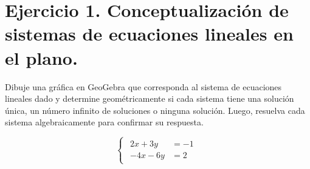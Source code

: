 \section{Ejercicio 1. Conceptualización de sistemas de ecuaciones lineales en el plano.}

Dibuje una gráfica en GeoGebra que corresponda al sistema de ecuaciones lineales dado y determine geométricamente si cada sistema tiene una solución única, un número infinito de soluciones o ninguna solución. Luego, resuelva cada sistema algebraicamente para confirmar su respuesta.

\[
\begin{cases}
    \begin{aligned}
        2x+3y &=-1 \\
        -4x-6y &=2
    \end{aligned}
\end{cases}
\]